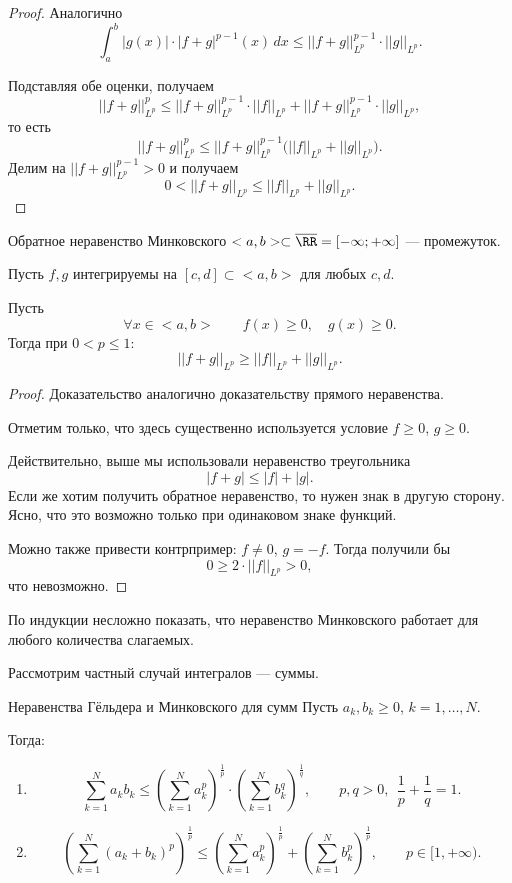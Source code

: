 \begin{proof}
	Аналогично
	\[
	\int_a^b |g(x)|\cdot |f+g|^{p-1}(x)\,dx
	\le
	||f+g||_{L^p}^{p-1}\cdot ||g||_{L^p}.
	\]
	
	Подставляя обе оценки, получаем
	\[
	||f+g||_{L^p}^p
	\le
	||f+g||_{L^p}^{p-1}\cdot ||f||_{L^p}
	+
	||f+g||_{L^p}^{p-1}\cdot ||g||_{L^p},
	\]
	то есть
	\[
	||f+g||_{L^p}^p
	\le
	||f+g||_{L^p}^{p-1}\bigl(||f||_{L^p}+||g||_{L^p}\bigr).
	\]
	Делим на $||f+g||_{L^p}^{p-1}>0$ и получаем
	\[
	0<||f+g||_{L^p}\le ||f||_{L^p}+||g||_{L^p}.
	\]
\end{proof}

\begin{Proposition}{Обратное неравенство Минковского}{}
	$<a,b>\subset \overline{\RR}=[-\infty;+\infty]$ --- промежуток.
	
	Пусть $f,g$ интегрируемы на $[c,d]\subset<a,b>$ для любых $c,d$.
	
	Пусть
	\[
	\forall x\in<a,b> \qquad f(x)\ge 0,\quad g(x)\ge 0.
	\]
	Тогда при $0<p\le 1$:
	\[
	||f+g||_{L^p}\ge ||f||_{L^p}+||g||_{L^p}.
	\]
\end{Proposition}

\begin{proof}
	Доказательство аналогично доказательству прямого неравенства.
	
	Отметим только, что здесь существенно используется условие $f\ge 0$, $g\ge 0$.
	
	Действительно, выше мы использовали неравенство треугольника
	\[
	|f+g|\le |f|+|g|.
	\]
	Если же хотим получить обратное неравенство, то нужен знак в другую сторону. Ясно, что это возможно только при одинаковом знаке функций.
	
	Можно также привести контрпример: $f\ne 0$, $g=-f$. Тогда получили бы
	\[
	0 \ge 2\cdot ||f||_{L^p} > 0,
	\]
	что невозможно.
\end{proof}

\begin{remark}
	По индукции несложно показать, что неравенство Минковского работает для любого количества слагаемых.
\end{remark}

\vspace{2\baselineskip}

Рассмотрим частный случай интегралов --- суммы.

\begin{Proposition}{Неравенства Гёльдера и Минковского для сумм}{}
	Пусть $a_k,b_k\ge 0$, \qquad $k=1,\ldots,N$.
	
	Тогда:
	\begin{enumerate}
		\item
		\[
		\sum_{k=1}^N a_k b_k
		\le
		\left(\sum_{k=1}^N a_k^p\right)^{\frac{1}{p}}
		\cdot
		\left(\sum_{k=1}^N b_k^q\right)^{\frac{1}{q}},
		\qquad
		p,q>0,\ \ \frac{1}{p}+\frac{1}{q}=1.
		\]
		\item
		\[
		\left(\sum_{k=1}^N (a_k+b_k)^p\right)^{\frac{1}{p}}
		\le
		\left(\sum_{k=1}^N a_k^p\right)^{\frac{1}{p}}
		+
		\left(\sum_{k=1}^N b_k^p\right)^{\frac{1}{p}},
		\qquad
		p\in[1,+\infty).
		\]
	\end{enumerate}
\end{Proposition}

